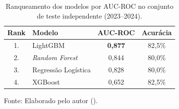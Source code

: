 \begin{table}[htbp]
    \centering
    \caption[Ranqueamento dos modelos no teste]{Ranqueamento dos modelos por AUC-ROC no conjunto de teste independente (2023--2024).}
    \label{tab:resultados}
    \begin{tabular}{clcc}
        \toprule
        \textbf{Rank} & \textbf{Modelo} & \textbf{AUC-ROC} & \textbf{Acurácia} \\
        \midrule
        1.\textordmasculine{} & LightGBM            & \textbf{0,877} & 82,5\% \\
        2.\textordmasculine{} & \textit{Random Forest} & 0,844 & 80,0\% \\
        3.\textordmasculine{} & Regressão Logística & 0,828 & 80,0\% \\
        4.\textordmasculine{} & XGBoost             & 0,652 & 82,5\% \\
        \bottomrule
    \end{tabular}

    \vspace{2pt}
    {\small Fonte: Elaborado pelo autor (\the\year).}
\end{table}
